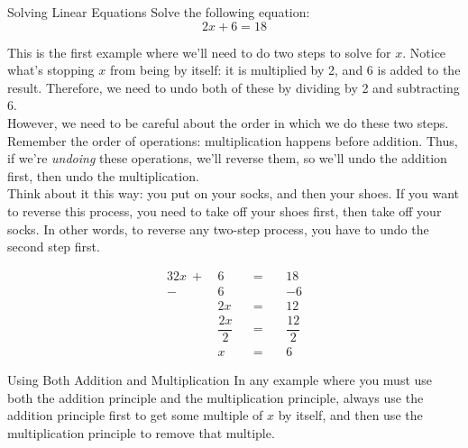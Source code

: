 \begin{example}{Solving Linear Equations}
Solve the following equation:
\[2x+6 = 18\]

\sol
This is the first example where we'll need to do two steps to solve for $x$.  Notice what's stopping $x$ from being by itself: it is multiplied by 2, and 6 is added to the result.  Therefore, we need to undo both of these by dividing by 2 and subtracting 6.\\

However, we need to be careful about the order in which we do these two steps.  Remember the order of operations: multiplication happens before addition.  Thus, if we're \emph{undoing} these operations, we'll reverse them, so we'll undo the addition first, then undo the multiplication.\\

Think about it this way: you put on your socks, and then your shoes.  If you want to reverse this process, you need to take off your shoes first, then take off your socks.  In other words, to reverse any two-step process, you have to undo the second step first.

\begin{alignat*}{3}
2x\ +\ &6\ &&=\ &&18\\
-&6\ &&\ &&-6\\
&2x &&=\ &&12\\
&\dfrac{2x}{2} &&=\ &&\dfrac{12}{2}\\
&x &&=\ &&\boxed{6}
\end{alignat*}
\end{example}

\begin{proc}{Using Both Addition and Multiplication}
In any example where you must use both the addition principle and the multiplication principle, always use the addition principle first to get some multiple of $x$ by itself, and then use the multiplication principle to remove that multiple.
\end{proc}

